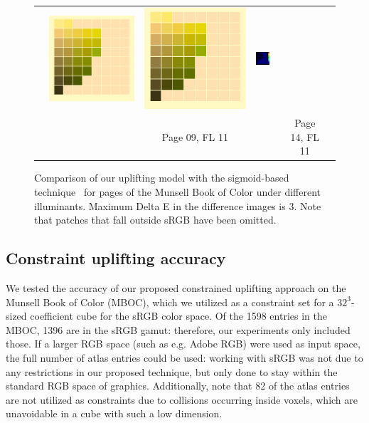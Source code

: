 \begin{figure}[ht!]
{\begin{tabular}{ccccccc}
			&\quad
			\includegraphics[width=.15\linewidth]{img/results_uplift_page14_originalFL11.png}
			&
			\includegraphics[width=.15\linewidth]{img/results_uplift_page14_ourFL11.png}
			&
			\includegraphics[width=.15\linewidth,height=5.25em]{img/results_uplift_page14_diff_ourFL11.png}\\
			& & Page 09, FL 11 & & & Page 14, FL 11 & \\
		\end{tabular}
	}
	\caption{Comparison of our uplifting model with the sigmoid-based technique~\cite{upsamplingJakobHanika} for pages of the Munsell Book of Color under different illuminants. Maximum Delta E in the difference images is 3. Note that patches that fall outside sRGB have been omitted.}
	\label{fig:results_uplift_munsell}
\end{figure}

\subsection{Constraint uplifting accuracy} \label{ssec:constraintAccuracy}

We tested the accuracy of our proposed constrained uplifting approach on the Munsell Book of Color (MBOC), which we utilized as a constraint set for a $32^3$-sized coefficient cube for the sRGB color space. Of the 1598 entries in the MBOC, 1396 are in the sRGB gamut: therefore, our experiments only included those. If a larger RGB space (such as e.g. Adobe RGB) were used as input space, the full number of atlas entries could be used: working with sRGB was not due to any restrictions in our proposed technique, but only done to stay within the standard RGB space of graphics. Additionally, note that 82 of the atlas entries are not utilized as constraints due to collisions occurring inside voxels, which are unavoidable in a cube with such a low dimension.

